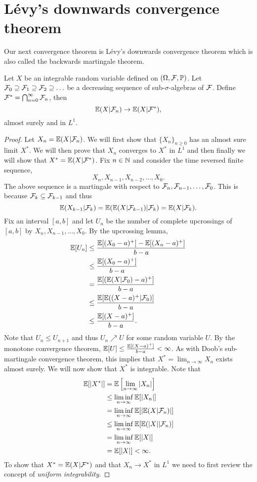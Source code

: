 \section{L\'evy's downwards convergence theorem}
Our next convergence theorem is L\'evy's downwards convergence theorem which is also called the backwards martingale theorem. 
\begin{theorem}
    Let $X$ be an integrable random variable defined on $({{\Omega}},{\mathcal{F}},{\mathbb{P}})$. Let ${\mathcal{F}}_0 \supseteq {\mathcal{F}}_1 \supseteq {\mathcal{F}}_2 \supseteq \ldots$ be a decreasing sequence of sub-$\sigma$-algebras of ${\mathcal{F}}$. Define ${\mathcal{F}}^* = \bigcap_{n=0}^\infty {\mathcal{F}}_n$, then 
    \[{\mathbb{E}}(X|{\mathcal{F}}_n) \to {\mathbb{E}}(X|{\mathcal{F}}^*), \]
    almost surely and in $L^1$.
\end{theorem}
\begin{proof}
    Let $X_n = {\mathbb{E}}(X|{\mathcal{F}}_n)$. We will first show that $\{X_n\}_{n \ge 0}$ has an almost sure limit $X^*$. We will then prove that $X_n$ converges to $X^*$ in $L^1$ and then finally we will show that $X^*={\mathbb{E}}(X|{\mathcal{F}}^*)$. Fix $n \in {{\mathbb N}}$ and consider the time reversed finite sequence,
    \[X_{n}, X_{n-1},X_{n-2},\ldots,X_0. \]
    The above sequence is a martingale with respect to ${\mathcal{F}}_n,{\mathcal{F}}_{n-1},\ldots,{\mathcal{F}}_0$. This is because ${\mathcal{F}}_{k} \subseteq {\mathcal{F}}_{k-1}$ and thus
    \[{\mathbb{E}}(X_{k-1}|{\mathcal{F}}_{k})  = {\mathbb{E}}({\mathbb{E}}(X|{\mathcal{F}}_{k-1})|{\mathcal{F}}_k)={\mathbb{E}}(X|{\mathcal{F}}_k). \]
    Fix an interval $[a,b]$ and let $U_n$ be the number of complete upcrossings of $[a,b]$ by $X_{n},X_{n-1},\ldots,X_0$. By the upcrossing lemma,
    \begin{align*}
        {\mathbb{E}}[U_n] &\le \frac{{\mathbb{E}}[(X_0-a)^+]-{\mathbb{E}}[(X_n-a)^+]}{b-a}\\
        &\le \frac{{\mathbb{E}}[(X_0-a)^+]}{b-a}\\
        &= \frac{{\mathbb{E}}[({\mathbb{E}}(X|{\mathcal{F}}_0)-a)^+]}{b-a}\\
        &\le \frac{{\mathbb{E}}[{\mathbb{E}}((X-a)^+|{\mathcal{F}}_0)]}{b-a}\\
        &\le \frac{{\mathbb{E}}[(X-a)^+]}{b-a}.
    \end{align*}
    Note that $U_n \le U_{n+1}$ and thus $U_n \nearrow U$ for some random variable $U$. By the monotone convergence theorem, ${\mathbb{E}}[U] \le \frac{{\mathbb{E}}[(X-a)^+]}{b-a}<\infty$. As with Doob's sub-martingale convergence theorem, this implies that $X^* = \lim_{n \to \infty} X_n$ exists almost surely. We will now show that $X^*$ is integrable. Note that
    \begin{align*}
        {\mathbb{E}}[{\left\lvert X^*\right\rvert}] &= {\mathbb{E}}\left[\lim_{n \to \infty}{\left\lvert X_n\right\rvert}\right]\\
        &\le \liminf_{n \to \infty}{\mathbb{E}}[{\left\lvert X_n\right\rvert}]\\
        &=\liminf_{n\to \infty} {\mathbb{E}}[{\left\lvert{\mathbb{E}}(X|{\mathcal{F}}_n)\right\rvert}]\\
        &\le \liminf_{n \to \infty} {\mathbb{E}}[{\mathbb{E}}({\left\lvert X\right\rvert}|{\mathcal{F}}_n)]\\
        &=\liminf_{n \to \infty} {\mathbb{E}}[{\left\lvert X\right\rvert}]\\
        &={\mathbb{E}}[{\left\lvert X\right\rvert}]<\infty.
    \end{align*} 
    To show that $X^* ={\mathbb{E}}(X|{\mathcal{F}}^*)$ and that $X_n \to X^*$ in $L^1$ we need to first review the concept of \emph{uniform integrability}.
\end{proof}


